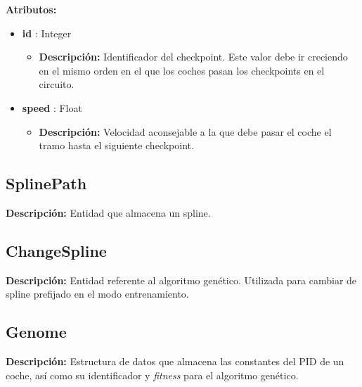 \textbf{Atributos: }
\begin{itemize}
    \item \textbf{id} : Integer
    \begin{itemize}
        \item \textbf{Descripción: }Identificador del checkpoint. Este valor debe ir creciendo en el mismo orden en el que los coches pasan los checkpoints en el circuito.
    \end{itemize}
    
    \item \textbf{speed} : Float
    \begin{itemize}
        \item \textbf{Descripción: }Velocidad aconsejable a la que debe pasar el coche el tramo hasta el siguiente checkpoint.
    \end{itemize}

\end{itemize}

\subsection{SplinePath}
\textbf{Descripción: }Entidad que almacena un spline.

\subsection{ChangeSpline}
\textbf{Descripción: }Entidad referente al algoritmo genético. Utilizada para cambiar de spline prefijado en el modo entrenamiento.

\subsection{Genome}
\textbf{Descripción: }Estructura de datos que almacena las constantes del PID de un coche, así como su identificador y \textit{fitness} para el algoritmo genético.

\bigskip

